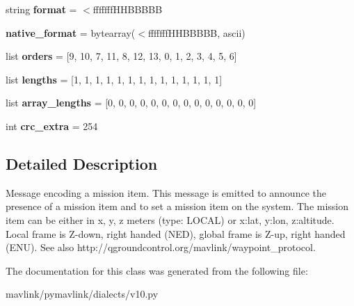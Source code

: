 \begin{DoxyCompactItemize}
\item 
\mbox{\label{classpymavlink_1_1dialects_1_1v10_1_1MAVLink__mission__item__message_a13f56250f67e3b71199c6264d560e137}} 
string {\bfseries format} = \textquotesingle{}$<$fffffff\+H\+H\+B\+B\+B\+BB\textquotesingle{}
\item 
\mbox{\label{classpymavlink_1_1dialects_1_1v10_1_1MAVLink__mission__item__message_abf1e40275b95d75d974c19faec031297}} 
{\bfseries native\+\_\+format} = bytearray(\textquotesingle{}$<$fffffff\+H\+H\+B\+B\+B\+BB\textquotesingle{}, \textquotesingle{}ascii\textquotesingle{})
\item 
\mbox{\label{classpymavlink_1_1dialects_1_1v10_1_1MAVLink__mission__item__message_adaa43bde91652c02100b370e131fb125}} 
list {\bfseries orders} = \mbox{[}9, 10, 7, 11, 8, 12, 13, 0, 1, 2, 3, 4, 5, 6\mbox{]}
\item 
\mbox{\label{classpymavlink_1_1dialects_1_1v10_1_1MAVLink__mission__item__message_aa697a556d8eb173e7c08f51de0756bd9}} 
list {\bfseries lengths} = \mbox{[}1, 1, 1, 1, 1, 1, 1, 1, 1, 1, 1, 1, 1, 1\mbox{]}
\item 
\mbox{\label{classpymavlink_1_1dialects_1_1v10_1_1MAVLink__mission__item__message_a7deab4794ac385694c24130a8b924522}} 
list {\bfseries array\+\_\+lengths} = \mbox{[}0, 0, 0, 0, 0, 0, 0, 0, 0, 0, 0, 0, 0, 0\mbox{]}
\item 
\mbox{\label{classpymavlink_1_1dialects_1_1v10_1_1MAVLink__mission__item__message_ac5e958d52289d50b7d8095d4fc1b8fb7}} 
int {\bfseries crc\+\_\+extra} = 254
\end{DoxyCompactItemize}


\subsection{Detailed Description}
\begin{DoxyVerb}Message encoding a mission item. This message is emitted to
announce                 the presence of a mission item and to
set a mission item on the system. The mission item can be
either in x, y, z meters (type: LOCAL) or x:lat, y:lon,
z:altitude. Local frame is Z-down, right handed (NED), global
frame is Z-up, right handed (ENU). See also
http://qgroundcontrol.org/mavlink/waypoint_protocol.
\end{DoxyVerb}
 

The documentation for this class was generated from the following file\+:\begin{DoxyCompactItemize}
\item 
mavlink/pymavlink/dialects/v10.\+py\end{DoxyCompactItemize}
